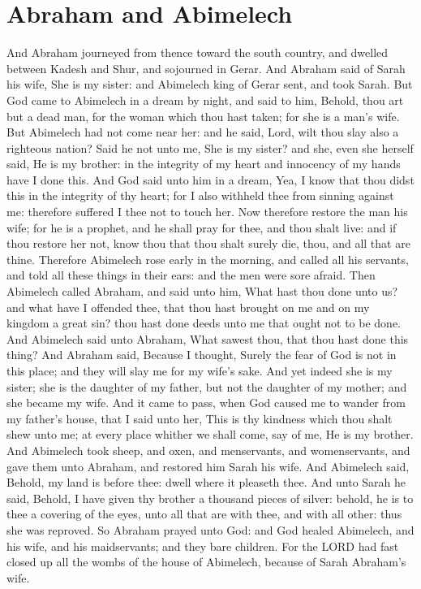 \section*{Abraham and Abimelech}
\begin{biblechapter} %
\verse And Abraham journeyed from thence toward the south country, and dwelled between Kadesh and Shur, and sojourned in Gerar.
\verse And Abraham said of Sarah his wife, She is my sister: and Abimelech king of Gerar sent, and took Sarah.
\verse But God came to Abimelech in a dream by night, and said to him, Behold, thou art but a dead man, for the woman which thou hast taken; for she is a man's wife.
\verse But Abimelech had not come near her: and he said, Lord, wilt thou slay also a righteous nation?
\verse Said he not unto me, She is my sister? and she, even she herself said, He is my brother: in the integrity of my heart and innocency of my hands have I done this.
\verse And God said unto him in a dream, Yea, I know that thou didst this in the integrity of thy heart; for I also withheld thee from sinning against me: therefore suffered I thee not to touch her.
\verse Now therefore restore the man his wife; for he is a prophet, and he shall pray for thee, and thou shalt live: and if thou restore her not, know thou that thou shalt surely die, thou, and all that are thine.
\verse Therefore Abimelech rose early in the morning, and called all his servants, and told all these things in their ears: and the men were sore afraid.
\verse Then Abimelech called Abraham, and said unto him, What hast thou done unto us? and what have I offended thee, that thou hast brought on me and on my kingdom a great sin? thou hast done deeds unto me that ought not to be done.
\verse And Abimelech said unto Abraham, What sawest thou, that thou hast done this thing?
\verse And Abraham said, Because I thought, Surely the fear of God is not in this place; and they will slay me for my wife's sake.
\verse And yet indeed she is my sister; she is the daughter of my father, but not the daughter of my mother; and she became my wife.
\verse And it came to pass, when God caused me to wander from my father's house, that I said unto her, This is thy kindness which thou shalt shew unto me; at every place whither we shall come, say of me, He is my brother.
\verse And Abimelech took sheep, and oxen, and menservants, and womenservants, and gave them unto Abraham, and restored him Sarah his wife.
\verse And Abimelech said, Behold, my land is before thee: dwell where it pleaseth thee.
\verse And unto Sarah he said, Behold, I have given thy brother a thousand pieces of silver: behold, he is to thee a covering of the eyes, unto all that are with thee, and with all other: thus she was reproved.
\verse So Abraham prayed unto God: and God healed Abimelech, and his wife, and his maidservants; and they bare children.
\verse For the LORD had fast closed up all the wombs of the house of Abimelech, because of Sarah Abraham's wife.
\end{biblechapter}

